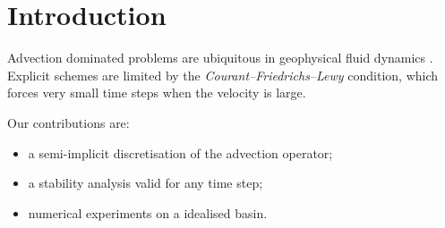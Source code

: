 \section{Introduction}

Advection dominated problems are ubiquitous in geophysical fluid dynamics \cite{parco}.
Explicit schemes are limited by the \emph{Courant--Friedrichs--Lewy} condition, which forces very small time steps when the velocity is large.


Our contributions are:
\begin{itemize}
\item a semi-implicit discretisation of the advection operator;
\item a stability analysis valid for any time step;
\item numerical experiments on a idealised basin.
\end{itemize}
